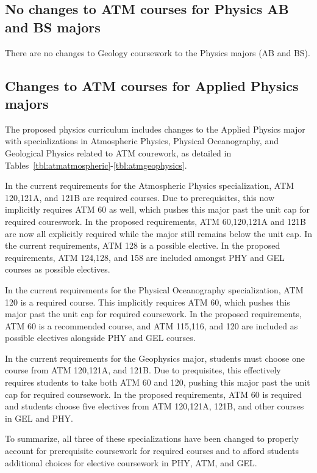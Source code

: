 \documentclass[12pt]{article}
\begin{document}
\subsection{No changes to ATM courses for Physics AB and BS majors}

There are no changes to Geology coursework to the Physics majors (AB
and BS).

\subsection{Changes to ATM courses for Applied Physics majors}

The proposed physics curriculum includes changes to the Applied
Physics major with specializations in Atmospheric Physics, Physical
Oceanography, and Geological Physics related to ATM courework, as
detailed in Tables~\ref{tbl:atmatmospheric}-\ref{tbl:atmgeophysics}.

In the current requirements for the Atmospheric Physics
specialization, ATM 120,121A, and 121B are required courses.  Due to
prerequisites, this now implicitly requires ATM 60 as well, which
pushes this major past the unit cap for required coureswork.  In the
proposed requirements, ATM 60,120,121A and 121B are now all explicitly
required while the major still remains below the unit cap.  In the
current requirements, ATM 128 is a possible elective.  In the proposed
requirements, ATM 124,128, and 158 are included amongst PHY and GEL
courses as possible electives.

In the current requirements for the Physical Oceanography
specialization, ATM 120 is a required course.  This implicitly
requires ATM 60, which pushes this major past the unit cap for
required coursework.  In the proposed requirements, ATM 60 is a
recommended course, and ATM 115,116, and 120 are included as possible
electives alongside PHY and GEL courses.

In the current requirements for the Geophysics major, students must
choose one course from ATM 120,121A, and 121B.  Due to prequisites,
this effectively requires students to take both ATM 60 and 120, 
pushing this major past the unit cap for required coursework.  In the
proposed requirements, ATM 60 is required and students choose five
electives from ATM 120,121A, 121B, and other courses in GEL and PHY.

To summarize, all three of these specializations have been changed to
properly account for prerequisite coursework for required courses and
to afford students additional choices for elective coursework in PHY,
ATM, and GEL.
\end{document}
